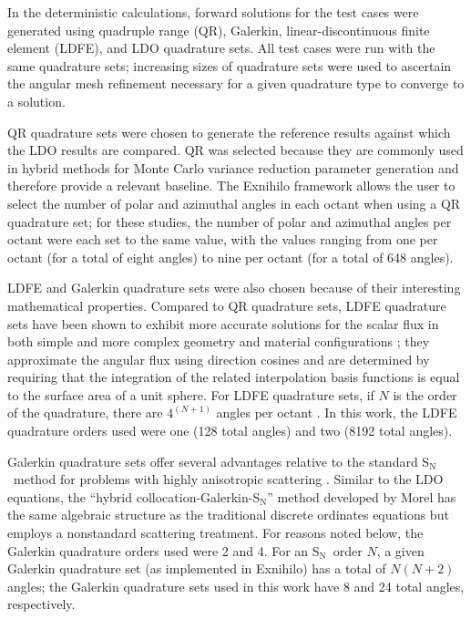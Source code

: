\documentclass{article} %
\newcommand{\sn}{S$_\mathrm{N}$}
\begin{document}
In the deterministic calculations, forward solutions for the test cases were
generated using quadruple range (QR), Galerkin, linear-discontinuous finite 
element (LDFE), and LDO quadrature sets. All test cases were run with the same 
quadrature sets; increasing sizes of quadrature sets were used to ascertain the
angular mesh refinement necessary for a given quadrature type to converge to a 
solution. 

QR quadrature sets were chosen to generate the reference results against which
the LDO results are compared. QR was selected because they are commonly used 
in hybrid methods for Monte Carlo variance reduction parameter generation and 
therefore provide a relevant baseline. The Exnihilo framework allows the user
to select the number of polar and azimuthal angles in each octant when using a
QR quadrature set; for these studies, the number of polar and azimuthal angles
per octant were each set to the same value, with the values ranging from one
per octant (for a total of eight angles) to nine per octant (for a total of
648 angles). 

LDFE and Galerkin quadrature sets were also chosen because of their interesting
mathematical properties. Compared to QR quadrature sets, LDFE quadrature sets
have been shown to exhibit more accurate solutions for the scalar flux in both 
simple and more complex geometry and material configurations \cite{ldfe}; they 
approximate the angular flux using direction cosines and are determined by
requiring that the integration of the related interpolation basis functions is
equal to the surface area of a unit sphere. For LDFE quadrature sets, if $N$ is
the order of the quadrature, there are $4^{(N+1)}$ angles per octant
\cite{exum}. In this work, the LDFE quadrature orders used were one (128 total
angles) and two (8192 total angles).

Galerkin quadrature sets offer several advantages relative to the standard \sn\
method for problems with highly anisotropic scattering \cite{morel}. Similar to
the LDO equations, the ``hybrid collocation-Galerkin-S$_\mathrm{N}$'' method
developed by Morel has the same algebraic structure as the traditional discrete
ordinates equations but employs a nonstandard scattering treatment.
For reasons noted below, the Galerkin quadrature orders used were 2 and 4. For
an \sn\ order $N$, a given Galerkin quadrature set (as implemented in Exnihilo)
has a total of $N(N+2)$ angles; the Galerkin quadrature sets
used in this work have 8 and 24 total angles, respectively.
\end{document}
